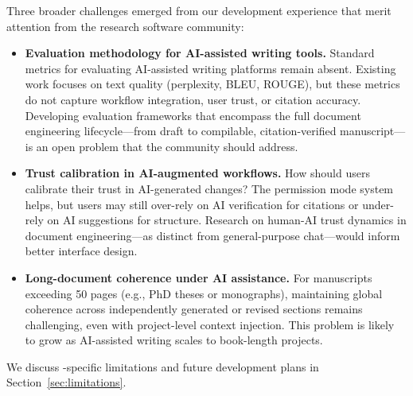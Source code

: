 Three broader challenges emerged from our development experience that merit
attention from the research software community:

\begin{itemize}
  \item \textbf{Evaluation methodology for AI-assisted writing tools.}
  Standard metrics for evaluating AI-assisted writing platforms remain absent.
  Existing work focuses on text quality (perplexity, BLEU, ROUGE), but these
  metrics do not capture workflow integration, user trust, or citation accuracy.
  Developing evaluation frameworks that encompass the full document engineering
  lifecycle---from draft to compilable, citation-verified manuscript---is an
  open problem that the community should address.

  \item \textbf{Trust calibration in AI-augmented workflows.}
  How should users calibrate their trust in AI-generated changes? The
  permission mode system helps, but users may still over-rely on AI
  verification for citations or under-rely on AI suggestions for structure.
  Research on human-AI trust dynamics in document engineering---as distinct
  from general-purpose chat---would inform better interface design.

  \item \textbf{Long-document coherence under AI assistance.}
  For manuscripts exceeding 50 pages (e.g., PhD theses or monographs),
  maintaining global coherence across independently generated or revised
  sections remains challenging, even with project-level context injection.
  This problem is likely to grow as AI-assisted writing scales to book-length
  projects.
\end{itemize}

We discuss \software{}-specific limitations and future development plans in
Section~\ref{sec:limitations}.
